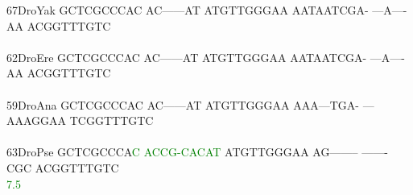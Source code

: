 \documentclass[11pt,twoside,reqno,a4paper]{article}
\begin{document}
{67\hspace*{2\charwidth}DroYak	GCTCGCCCAC	AC------AT	ATGTTGGGAA	AATAATCGA-	---A----AA	ACGGTTTGTC	\\
\hspace*{4\charwidth}\hspace*{7\charwidth}\hspace*{1\charwidth}\hspace*{1\charwidth}\hspace*{1\charwidth}\hspace*{1\charwidth}\hspace*{1\charwidth}\hspace*{1\charwidth}\\
62\hspace*{2\charwidth}DroEre	GCTCGCCCAC	AC------AT	ATGTTGGGAA	AATAATCGA-	---A----AA	ACGGTTTGTC	\\
\hspace*{4\charwidth}\hspace*{7\charwidth}\hspace*{1\charwidth}\hspace*{1\charwidth}\hspace*{1\charwidth}\hspace*{1\charwidth}\hspace*{1\charwidth}\hspace*{1\charwidth}\\
59\hspace*{2\charwidth}DroAna	GCTCGCCCAC	AC------AT	ATGTTGGGAA	AAA---TGA-	---AAAGGAA	TCGGTTTGTC	\\
\hspace*{4\charwidth}\hspace*{7\charwidth}\hspace*{1\charwidth}\hspace*{1\charwidth}\hspace*{1\charwidth}\hspace*{1\charwidth}\hspace*{1\charwidth}\hspace*{1\charwidth}\\
63\hspace*{2\charwidth}DroPse	GCTCGCCCA\textcolor{Green}{C}	\textcolor{Green}{A}\textcolor{Green}{C}\textcolor{Green}{C}\textcolor{Green}{G}\textcolor{Green}{-}\textcolor{Green}{C}\textcolor{Green}{A}\textcolor{Green}{C}\textcolor{Green}{A}\textcolor{Green}{T}	ATGTTGGGAA	AG--------	-------CGC	ACGGTTTGTC	\\
\hspace*{4\charwidth}\hspace*{7\charwidth}\hspace*{9\charwidth}\textcolor{Green}{7.5}\hspace*{1\charwidth}\hspace*{1\charwidth}\hspace*{1\charwidth}\hspace*{1\charwidth}\hspace*{1\charwidth}\hspace*{1\charwidth}\\
}
\end{document}
